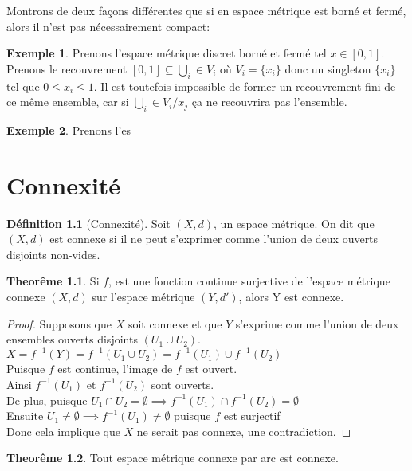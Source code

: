 \documentclass[12pt]{book}
\theoremstyle{definition}
\newtheorem{definition}{Définition}[section]
\newtheorem*{example}{Exemple}
\newtheorem{theorem}{Theorême}[section]
\begin{document}
Montrons de deux façons différentes que si en espace métrique est borné et fermé, alors il n'est pas nécessairement compact:

\begin{example}
    Prenons l'espace métrique discret borné et fermé tel $x \in [0, 1]$. Prenons le recouvrement $[0,1] \subseteq \bigcup_i\in V_i$ où $V_i = \{x_i\}$ donc 
    un singleton $\{x_i\}$ tel que $0 \leq x_i \leq 1$. Il est toutefois impossible de former un recouvrement fini de ce même ensemble, car si $\bigcup_i\in V_i / {x_j}$
    ça ne recouvrira pas l'ensemble.
\end{example}

\begin{example}
    Prenons l'es
\end{example}
\chapter{Connexité}
\begin{definition}[Connexité]
    \label{def:connexite}
    Soit $(X,d)$, un espace métrique. On dit que $(X,d)$ est connexe si il ne peut s'exprimer comme l'union de deux ouverts disjoints non-vides.
\end{definition}

\begin{theorem}
    Si $f$, est une fonction continue surjective de l'espace métrique connexe $(X,d)$ sur l'espace métrique $(Y, d')$, alors Y est connexe.
\end{theorem}

\begin{proof}
    Supposons que $X$ soit connexe et que $Y$ s'exprime comme l'union de deux ensembles ouverts disjoints $(U_1 \cup U_2)$.\\
    $X = f^{-1}(Y) = f^{-1}(U_1 \cup U_2) = f^{-1}(U_1) \cup f^{-1}(U_2)$\\
    Puisque $f$ est continue, l'image de $f$ est ouvert. \\
    Ainsi $f^{-1}(U_1)$ et $f^{-1}(U_2)$ sont ouverts.\\
    De plus, puisque $U_1 \cap U_2 = \emptyset \implies f^{-1}(U_1) \cap f^{-1}(U_2) = \emptyset$\\
    Ensuite $U_1 \neq \emptyset \implies f^{-1}(U_1) \neq \emptyset$ puisque $f$ est surjectif\\
    Donc cela implique que $X$ ne serait pas connexe, une contradiction.
\end{proof}

\begin{theorem}
    Tout espace métrique connexe par arc est connexe.
\end{theorem}
\end{document}
